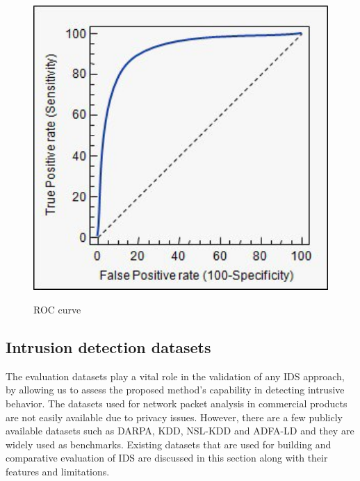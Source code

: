 \documentclass[12pt]{acmart}
\begin{document}
\begin{enumerate}
\begin{figure}[H]
{                \includegraphics[width=130mm]{Picture2.png}
                }
                \caption{ROC curve}
                \label{fig2}
            \end{figure}   
        \end{enumerate}
    \subsection{Intrusion detection datasets}
        The evaluation datasets play a vital role in the validation of any IDS approach, by allowing us to assess the proposed method’s capability in detecting intrusive behavior. The datasets used for network packet analysis in commercial products are not easily available due to privacy issues. However, there are a few publicly available datasets such as DARPA, KDD, NSL-KDD and ADFA-LD and they are widely used as benchmarks. Existing datasets that are used for building and comparative evaluation of IDS are discussed in this section along with their features and limitations.
\end{document}
